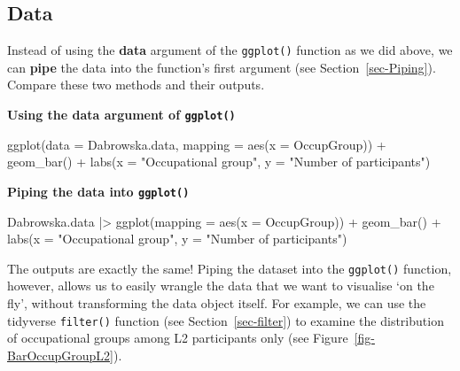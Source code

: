 \documentclass[
  letterpaper,
  DIV=11,
  numbers=noendperiod]{scrreprt}
\newenvironment{Shaded}{\begin{snugshade}}{\end{snugshade}}
\newcommand{\AttributeTok}[1]{\textcolor[rgb]{0.40,0.45,0.13}{#1}}
\newcommand{\FunctionTok}[1]{\textcolor[rgb]{0.28,0.35,0.67}{#1}}
\newcommand{\NormalTok}[1]{\textcolor[rgb]{0.00,0.23,0.31}{#1}}
\newcommand{\SpecialCharTok}[1]{\textcolor[rgb]{0.37,0.37,0.37}{#1}}
\newcommand{\StringTok}[1]{\textcolor[rgb]{0.13,0.47,0.30}{#1}}
\begin{document}
\subsection{Data}\label{sec-ggplotData}

Instead of using the \textbf{data} argument of the \texttt{ggplot()}
function as we did above, we can \textbf{pipe} the data into the
function's first argument (see Section~\ref{sec-Piping}). Compare these
two methods and their outputs.

\textbf{Using the data argument of \texttt{ggplot()}}

\begin{Shaded}
\begin{Highlighting}[]
\FunctionTok{ggplot}\NormalTok{(}\AttributeTok{data =}\NormalTok{ Dabrowska.data,}
       \AttributeTok{mapping =} \FunctionTok{aes}\NormalTok{(}\AttributeTok{x =}\NormalTok{ OccupGroup)) }\SpecialCharTok{+}
  \FunctionTok{geom\_bar}\NormalTok{() }\SpecialCharTok{+}
  \FunctionTok{labs}\NormalTok{(}\AttributeTok{x =} \StringTok{"Occupational group"}\NormalTok{,}
       \AttributeTok{y =} \StringTok{"Number of participants"}\NormalTok{)}
\end{Highlighting}
\end{Shaded}

\textbf{Piping the data into \texttt{ggplot()}}

\begin{Shaded}
\begin{Highlighting}[]
\NormalTok{Dabrowska.data }\SpecialCharTok{|\textgreater{}} 
  \FunctionTok{ggplot}\NormalTok{(}\AttributeTok{mapping =} \FunctionTok{aes}\NormalTok{(}\AttributeTok{x =}\NormalTok{ OccupGroup)) }\SpecialCharTok{+}
  \FunctionTok{geom\_bar}\NormalTok{() }\SpecialCharTok{+}
  \FunctionTok{labs}\NormalTok{(}\AttributeTok{x =} \StringTok{"Occupational group"}\NormalTok{,}
       \AttributeTok{y =} \StringTok{"Number of participants"}\NormalTok{)}
\end{Highlighting}
\end{Shaded}

The outputs are exactly the same! Piping the dataset into the
\texttt{ggplot()} function, however, allows us to easily wrangle the
data that we want to visualise `on the fly', without transforming the
data object itself. For example, we can use the tidyverse
\texttt{filter()} function (see Section~\ref{sec-filter}) to examine the
distribution of occupational groups among L2 participants only (see
Figure~\ref{fig-BarOccupGroupL2}).
\end{document}
